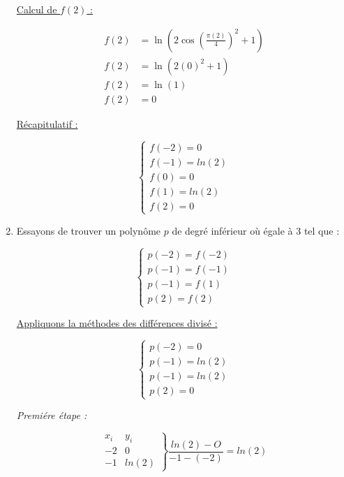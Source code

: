 \documentclass[12pt, letterpaper]{article}
\begin{document}
\begin{enumerate}
  \underline{Calcul de $f(2)$ :}
  
  \begin{equation*}
    \begin{split}
      f(2) & = \ln(2\cos(\frac{\pi(2)}{4})^2 + 1) \\
      f(2) & = \ln(2(0)^2 + 1) \\
      f(2) & = \ln(1) \\
      f(2) & = 0
    \end{split}
  \end{equation*}

  \underline{Récapitulatif :}

  $$
  \left\{
  \begin{array}{l}
    f(-2) = 0 \\
    f(-1) = ln(2) \\
    f(0) = 0 \\
    f(1) = ln(2) \\
    f(2) = 0
  \end{array}
  \right.
  $$

\item Essayons de trouver un polynôme $p$ de degré inférieur où égale
  à 3 tel que :

  \begin{equation*}
    \left\{
    \begin{array}{l}
      p(-2) = f(-2) \\
      p(-1) = f(-1) \\
      p(-1) = f(1) \\
      p(2) = f(2) 
    \end{array}
    \right.
  \end{equation*}

  \underline{Appliquons la méthodes des différences divisé :}

  \begin{equation*}
    \left\{
    \begin{array}{l}
      p(-2) = 0 \\
      p(-1) = ln(2) \\
      p(-1) = ln(2) \\
      p(2) = 0 
    \end{array}
    \right.
  \end{equation*}

  \textit{Premiére étape :}

  \begin{equation*}
    \left.
    \begin{array}{ll}
      x_i & y_i \\
      -2 & 0 \\
      -1 & ln(2)
    \end{array}
    \right\}
    \frac{ln(2) - O}{-1 - (-2)} = ln(2)
  \end{equation*}


\end{enumerate}
\end{document}
